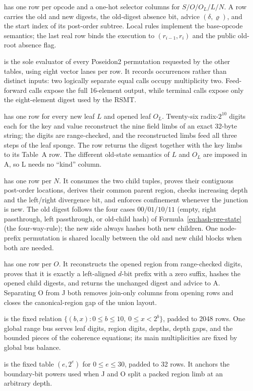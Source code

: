 \documentclass[twocolumn]{article}
\begin{document}
\begin{description}[nosep]
    \item[Table A (opcode execution)] has one row per opcode and a one-hot selector columns for $S/O/O_L/L/N$. A row carries the old and new digests, the old-digest absence bit, advice $(\delta,\varrho)$, and the start index of its post-order subtree. Local rules implement the base-opcode semantics; the last real row binds the execution to $(r_{i-1},r_i)$ and the public old-root absence flag.
    \item[Table B (Poseidon2)] is the sole evaluator of every Poseidon2 permutation requested by the other tables, using eight vector lanes per row. It records occurrences rather than distinct inputs: two logically separate equal calls occupy multiplicity two. Feed-forward calls expose the full 16-element output, while terminal calls expose only the eight-element digest used by the RSMT.
    \item[Table L (canonical leaves)] has one row for every new leaf $L$ and opened leaf $O_L$. Twenty-six radix-$2^{10}$ digits each for the key and value reconstruct the nine field limbs of an exact 32-byte string; the digits are range-checked, and the reconstructed limbs feed all three steps of the leaf sponge. The row returns the digest together with the key limbs to its Table~A row. The different old-state semantics of $L$ and $O_L$ are imposed in A, so L needs no ``kind'' column.
    \item[Table J (junction joins)] has one row per $N$. It consumes the two child tuples, proves their contiguous post-order locations, derives their common parent region, checks increasing depth and the left/right divergence bit, and enforces confinement whenever the junction is new. The old digest follows the four cases $00/01/10/11$ (empty, right passthrough, left passthrough, or old-child hash) of Formula~\ref{eq:hash-pre-state} (the four-way-rule); the new side always hashes both new children. One node-prefix permutation is shared locally between the old and new child blocks when both are needed.
    \item[Table O (canonical junction openings)] has one row per $O$. It reconstructs the opened region from range-checked digits, proves that it is exactly a left-aligned $d$-bit prefix with a zero suffix, hashes the opened child digests, and returns the unchanged digest and advice to A. Separating O from J both removes join-only columns from opening rows and closes the canonical-region gap of the union layout.
    \item[Table R (range)] is the fixed relation $\{(b,x):0\leq b\leq10,\ 0\leq x<2^b\}$, padded to 2048 rows. One global range bus serves leaf digits, region digits, depths, depth gaps, and the bounded pieces of the coherence equations; its main multiplicities are fixed by global bus balance.
    \item[Table P (powers)] is the fixed table $(e,2^e)$ for $0\leq e\leq30$, padded to 32 rows. It anchors the boundary-bit powers used when J and O split a packed region limb at an arbitrary depth.
\end{description}
\end{document}

